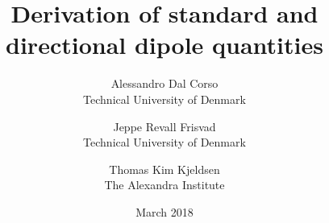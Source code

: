 \documentclass[10pt,a4paper]{article}
\title{Derivation of standard and directional dipole quantities}
\date{March 2018}
\author{Alessandro Dal Corso \\ Technical University of Denmark \and Jeppe Revall Frisvad \\ Technical University of Denmark
\and Thomas Kim Kjeldsen \\ The Alexandra Institute
}
\begin{document}
\maketitle
\newcommand{\vecfunc}[2] {\mathbf{#1}(\mathbf{#2})}
\newcommand{\func}[2] {{#1}(\mathbf{#2})}
\newcommand{\omegafunc}[2] {{#1}(\mathbf{#2}, \vec{\omega})}


\newcommand{\xvecfunc}[1] {\vecfunc{#1}{x}}
\newcommand{\xfunc}[1] {\func{#1}{x}}
\newcommand{\xomegafunc}[1] {\omegafunc{#1}{x}}
\newcommand{\nablavec} {{\nabla}}
\newcommand{\omegavec} {\vec{\omega}}
\newcommand{\sphere}[2] {\int_{4\pi}{#1}\ d{\ifthenelse{\isempty{#2}{}}{{\omega}}{#2}}}
\newcommand{\hemisphere}[2] {\int_{2\pi_+}{#1}\ d{\ifthenelse{\isempty{#2}{}}{{\omega}}{#2}}}
\newcommand{\lowerhemisphere}[2] {\int_{2\pi_-}{#1}\ d{\ifthenelse{\isempty{#2}{}}{{\omega}}{#2}}}

\newcommand{\absorption}{\sigma_a}
\newcommand{\transmission}{\sigma_{tr}}
\newcommand{\scattering}{\sigma_s}
\newcommand{\extinction}{\sigma_t}
\newcommand{\fluence}{G_0}
\newcommand{\flux}{\mathbf{G}_1}
\newcommand{\sourcezero}[1]{\func{Q_0}{#1}}
\newcommand{\sourcezerox}{\xfunc{Q_0}}
\newcommand{\sourceone}[1]{\mathbf{Q}_1(\mathbf{#1})}
\newcommand{\sourceonex}{\mathbf{Q}_1(\mathbf{x})}
\newcommand{\redsca}{{\sigma}'_s}
\newcommand{\redext}{{\sigma}'_t}
\newcommand{\redscaEddington}{\tilde{\sigma}_s}
\newcommand{\redextEddington}{\tilde{\sigma}_t}
\newcommand{\de}{\text{d}}
\newcommand{\cphi}{C_{\phi}}
\newcommand{\cE}{C_{\mathbf{E}}}
\end{document}
